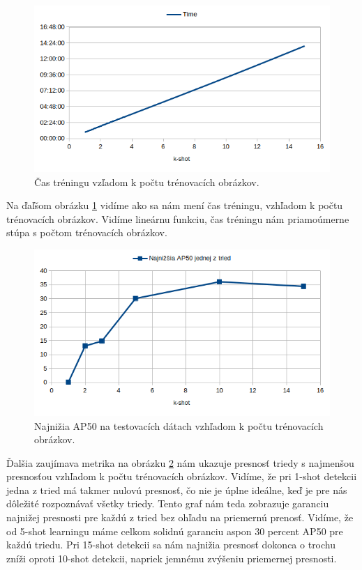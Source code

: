 \begin{figure}[H]
\includegraphics[width=\textwidth]{images/results_time.png}
\centering
\caption{Čas tréningu vzľadom k počtu trénovacích obrázkov.}
\label{fig:image38}
\end{figure}

Na ďaľšom obrázku \ref{fig:image38} vidíme ako sa nám mení čas tréningu, vzhľadom k počtu trénovacích obrázkov. Vidíme lineárnu funkciu, čas tréningu nám priamoúmerne stúpa s počtom trénovacích obrázkov.

\begin{figure}[H]
\includegraphics[width=\textwidth]{images/results_lowest_AP50.png}
\centering
\caption{Najnižia AP50 na testovacích dátach vzhľadom k počtu trénovacích obrázkov.}
\label{fig:image39}
\end{figure}

Ďalšia zaujímava metrika na obrázku \ref{fig:image39} nám ukazuje presnosť triedy s najmenšou presnosťou vzhľadom k počtu trénovacích obrázkov. Vidíme, že pri 1-shot detekcii jedna z tried má takmer nulovú presnosť, čo nie je úplne ideálne, keď je pre nás dôležité rozpoznávať všetky triedy. Tento graf nám teda zobrazuje garanciu najnižej presnosti pre každú z tried bez ohľadu na priemernú prenosť. Vidíme, že od 5-shot learningu máme celkom solidnú garanciu aspon 30 percent AP50 pre každú triedu. Pri 15-shot detekcii sa nám najnižia presnosť dokonca o trochu zníži oproti 10-shot detekcii, napriek jemnému zvýšeniu priemernej presnosti. 






